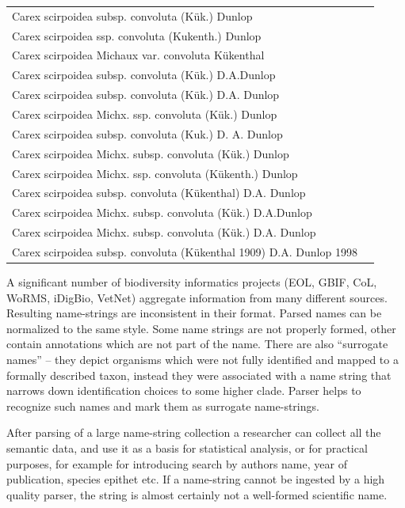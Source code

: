 \documentclass{bmcart}
\begin{document}
\begin{tabular}{| l | r |}
Carex scirpoidea subsp. convoluta (Kük.) Dunlop & \\
Carex scirpoidea ssp. convoluta (Kukenth.) Dunlop & \\
Carex scirpoidea Michaux var. convoluta Kükenthal & \\
Carex scirpoidea subsp. convoluta (Kük.) D.A.Dunlop & \\
Carex scirpoidea subsp. convoluta (Kük.) D.A. Dunlop & \\
Carex scirpoidea Michx. ssp. convoluta (Kük.) Dunlop & \\
Carex scirpoidea subsp. convoluta (Kuk.) D. A. Dunlop & \\
Carex scirpoidea Michx. subsp. convoluta (Kük.) Dunlop & \\
Carex scirpoidea Michx. ssp. convoluta (Kükenth.) Dunlop & \\
Carex scirpoidea subsp. convoluta (Kükenthal) D.A. Dunlop & \\
Carex scirpoidea Michx. subsp. convoluta (Kük.) D.A.Dunlop & \\
Carex scirpoidea Michx. subsp. convoluta (Kük.) D.A. Dunlop & \\
Carex scirpoidea subsp. convoluta (Kükenthal 1909) D.A. Dunlop 1998 & \\
\hline
\end{tabular}

A significant number of biodiversity informatics projects (EOL, GBIF, CoL,
WoRMS, iDigBio, VetNet) aggregate information from many different sources.
Resulting name-strings are inconsistent in their format. Parsed names can be
normalized to the same style. Some name strings are not properly formed, other
contain annotations which are not part of the name. There are also “surrogate
names” -- they depict organisms which were not fully identified and mapped to a
formally described taxon, instead they were associated with a name string that
narrows down identification choices to some higher clade. Parser helps to
recognize such names and mark them as surrogate name-strings.  

After parsing of a large name-string collection a researcher can collect all
the semantic data, and use it as a basis for statistical analysis, or for
practical purposes, for example for introducing search by authors name, year of
publication, species epithet etc. If a name-string cannot be ingested by a high
quality parser, the string is almost certainly not a well-formed scientific
name. 
\end{document}
